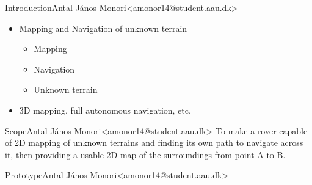 \begin{frame}{Introduction}{Antal János Monori\newline<amonor14@student.aau.dk>}
	\begin{itemize}
		\item <2-> Mapping and Navigation of unknown terrain
		\begin{itemize}
			\item <3-> Mapping %
			\item <4-> Navigation %
			\item <5-> Unknown terrain %
		\end{itemize}
		\item <6-> 3D mapping, full autonomous navigation, etc. %
	\end{itemize}
\end{frame}

\begin{frame}{Scope}{Antal János Monori\newline<amonor14@student.aau.dk>}
	To make a rover capable of 2D mapping of unknown terrains and finding its own path to navigate across it, then providing a usable 2D map of the surroundings from point A to B.
\end{frame}

\begin{frame}{Prototype}{Antal János Monori\newline<amonor14@student.aau.dk>}
	\begin{figure}[h!]
	\end{figure}
\end{frame}

